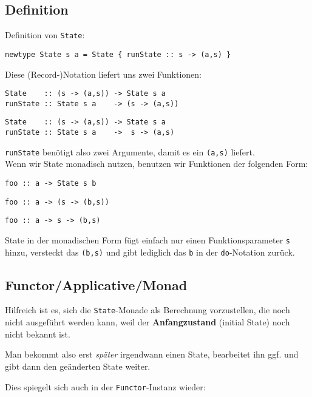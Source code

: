 \documentclass{beamer}
\begin{document}
\subsection{Definition}
\begin{frame}[fragile]
Definition von \texttt{State}:
\begin{verbatim}
newtype State s a = State { runState :: s -> (a,s) }
\end{verbatim}
\pause
Diese (Record-)Notation liefert uns zwei Funktionen:
\begin{overprint}
\begin{verbatim}
State    :: (s -> (a,s)) -> State s a
runState :: State s a    -> (s -> (a,s))
\end{verbatim}
\begin{verbatim}
State    :: (s -> (a,s)) -> State s a
runState :: State s a    ->  s -> (a,s)
\end{verbatim}
\end{overprint}
\smallskip

\texttt{runState} benötigt also zwei Argumente, damit es ein \texttt{(a,s)} liefert.\bigskip \\
Wenn wir State monadisch nutzen, benutzen wir Funktionen der folgenden Form:
\begin{overprint}
\begin{verbatim}
foo :: a -> State s b
\end{verbatim}
\begin{verbatim}
foo :: a -> (s -> (b,s))
\end{verbatim}
\begin{verbatim}
foo :: a -> s -> (b,s)
\end{verbatim}
\end{overprint}
State in der monadischen Form fügt einfach nur einen Funktionsparameter \texttt{s} hinzu, versteckt das \texttt{(b,s)} und gibt lediglich das \texttt{b} in der \texttt{do}-Notation zurück.
\end{frame}

\subsection{Functor/Applicative/Monad}
\begin{frame}[fragile]
Hilfreich ist es, sich die \texttt{State}-Monade als Berechnung vorzustellen, die noch nicht ausgeführt werden kann, weil der \textbf{Anfangzustand} (initial State) noch nicht bekannt ist.\bigskip

\pause
Man bekommt also erst \emph{später} irgendwann einen State, bearbeitet ihn ggf. und gibt dann den geänderten State weiter.\bigskip

\pause
Dies spiegelt sich auch in der \texttt{Functor}-Instanz wieder:
\end{frame}
\end{document}
